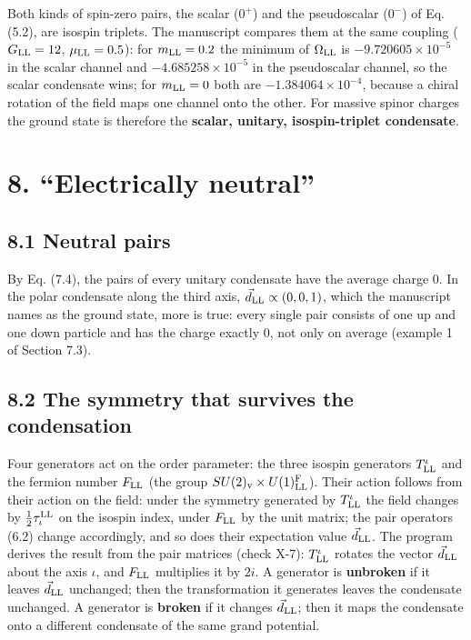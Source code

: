 \documentclass[
  10pt,
]{article}
\begin{document}
Both kinds of spin-zero pairs, the scalar (\(0^+\)) and the pseudoscalar
(\(0^-\)) of Eq. (5.2), are isospin triplets. The manuscript compares
them at the same coupling (\(G_{\rm LL}=12\), \(\mu_{\rm LL}=0.5\)): for
\(m_{\rm LL}=0.2\) the minimum of \(\Omega_{\rm LL}\) is
\(-9.720605\times10^{-5}\) in the scalar channel and
\(-4.685258\times10^{-5}\) in the pseudoscalar channel, so the scalar
condensate wins; for \(m_{\rm LL}=0\) both are
\(-1.384064\times10^{-4}\), because a chiral rotation of the field maps
one channel onto the other. For massive spinor charges the ground state
is therefore the \textbf{scalar, unitary, isospin-triplet condensate}.

\hypertarget{electrically-neutral}{%
\section{8. ``Electrically neutral''}\label{electrically-neutral}}

\hypertarget{neutral-pairs}{%
\subsection{8.1 Neutral pairs}\label{neutral-pairs}}

By Eq. (7.4), the pairs of every unitary condensate have the average
charge 0. In the polar condensate along the third axis,
\(\vec d_{\rm LL}\propto(0,0,1)\), which the manuscript names as the
ground state, more is true: every single pair consists of one up and one
down particle and has the charge exactly 0, not only on average (example
1 of Section 7.3).

\hypertarget{the-symmetry-that-survives-the-condensation}{%
\subsection{8.2 The symmetry that survives the
condensation}\label{the-symmetry-that-survives-the-condensation}}

Four generators act on the order parameter: the three isospin generators
\(T^\iota_{\rm LL}\) and the fermion number \(F_{\rm LL}\) (the group
\(SU(2)_{\rm v}\times U(1)^{\rm F}_{\rm LL}\)). Their action follows
from their action on the field: under the symmetry generated by
\(T^\iota_{\rm LL}\) the field changes by
\(\tfrac12\tau^{\rm LL}_\iota\) on the isospin index, under
\(F_{\rm LL}\) by the unit matrix; the pair operators (6.2) change
accordingly, and so does their expectation value \(\vec d_{\rm LL}\).
The program derives the result from the pair matrices (check X-7):
\(T^\iota_{\rm LL}\) rotates the vector \(\vec d_{\rm LL}\) about the
axis \(\iota\), and \(F_{\rm LL}\) multiplies it by \(2i\). A generator
is \textbf{unbroken} if it leaves \(\vec d_{\rm LL}\) unchanged; then
the transformation it generates leaves the condensate unchanged. A
generator is \textbf{broken} if it changes \(\vec d_{\rm LL}\); then it
maps the condensate onto a different condensate of the same grand
potential.
\end{document}
